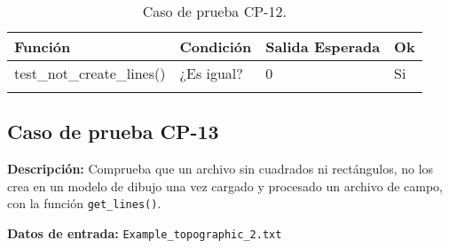 \begin{longtable}[]{@{}llll@{}}
\toprule
\begin{minipage}[b]{0.6\columnwidth}\raggedright\strut
Función\strut
\end{minipage} & \begin{minipage}[b]{0.20\columnwidth}\raggedright\strut
Condición\strut
\end{minipage} & \begin{minipage}[b]{0.15\columnwidth}\raggedright\strut
Salida Esperada\strut
\end{minipage} & \begin{minipage}[b]{0.05\columnwidth}\raggedright\strut
Ok\strut
\end{minipage}\tabularnewline
\midrule
\endhead
\begin{minipage}[t]{0.6\columnwidth}\raggedright\strut
test\_not\_create\_lines()\strut
\end{minipage} & \begin{minipage}[t]{0.20\columnwidth}\raggedright\strut
¿Es igual?\strut
\end{minipage} & \begin{minipage}[t]{0.15\columnwidth}\raggedright\strut
0\strut
\end{minipage} & \begin{minipage}[t]{0.05\columnwidth}\raggedright\strut
Si\strut
\end{minipage}\tabularnewline

\bottomrule
\caption{Caso de prueba CP-12.}
\end{longtable}


\subsection{Caso de prueba CP-13}

\textbf{Descripción:} Comprueba que un archivo sin cuadrados ni rectángulos, no los crea en un modelo de dibujo una vez cargado y procesado un archivo de campo, con la función \texttt{get\_lines()}.

\textbf{Datos de entrada:} \texttt{Example\_topographic\_2.txt}


